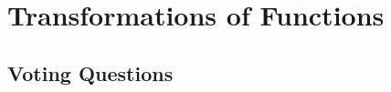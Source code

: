 \section{Transformations of Functions} \label{S:0.3.NewFromOld}


\newpage

\newpage

\newpage
\subsection*{Voting Questions}

\newpage
